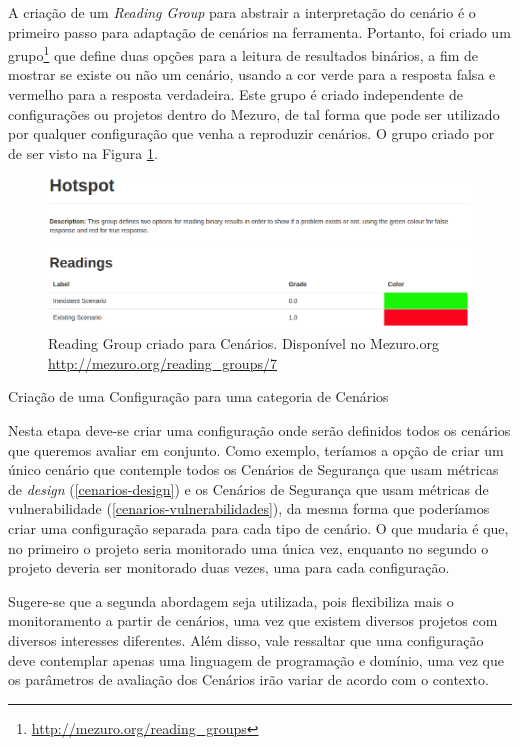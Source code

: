 A criação de um \emph{Reading Group} para abstrair a interpretação do cenário é o primeiro passo para adaptação de cenários na ferramenta. Portanto, foi criado um grupo\footnote{\url{http://mezuro.org/reading_groups}} que define duas opções para a leitura de resultados binários, a fim de mostrar se existe ou não um cenário, usando a cor verde para a resposta falsa e vermelho para a resposta verdadeira. Este grupo é criado independente de configurações ou projetos dentro do Mezuro, de tal forma que pode ser utilizado por qualquer configuração que venha a reproduzir cenários. O grupo criado por de ser visto na Figura \ref{reading_group}.

\graphicspath{{figuras/}}
\begin{figure}[h]
\centering
\includegraphics[width=1.0\textwidth]{reading_group}
\caption{Reading Group criado para Cenários. Disponível no Mezuro.org \url{http://mezuro.org/reading_groups/7}}
\label{reading_group}
\end{figure}

\begin{description}
	\item[Criação de uma Configuração para uma categoria de Cenários]
\end{description}

Nesta etapa deve-se criar uma configuração onde serão definidos todos os cenários que queremos avaliar em conjunto. Como exemplo, teríamos a opção de criar um único cenário que contemple todos os Cenários de Segurança que usam métricas de \emph{design} (\ref{cenarios-design}) e os Cenários de Segurança que usam métricas de vulnerabilidade (\ref{cenarios-vulnerabilidades}), da mesma forma que poderíamos criar uma configuração separada para cada tipo de cenário. O que mudaria é que, no primeiro o projeto seria monitorado uma única vez, enquanto no segundo o projeto deveria ser monitorado duas vezes, uma para cada configuração. 

Sugere-se que a segunda abordagem seja utilizada, pois flexibiliza mais o monitoramento a partir de cenários, uma vez que existem diversos projetos com diversos interesses diferentes. Além disso, vale ressaltar que uma configuração deve contemplar apenas uma linguagem de programação e domínio, uma vez que os parâmetros de avaliação dos Cenários irão variar de acordo com o contexto.

